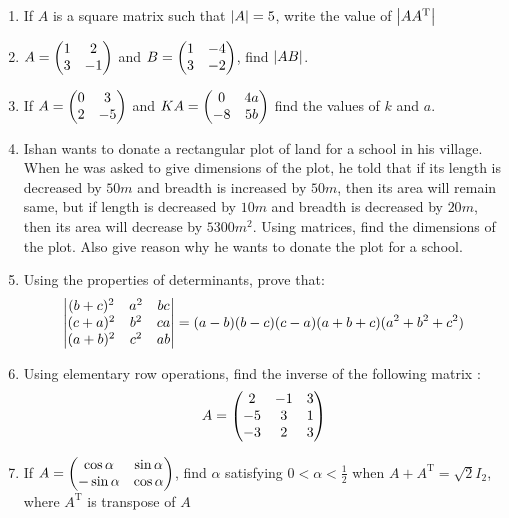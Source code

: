 \begin{enumerate}
    \item If $A$ is a square matrix such that $\left\vert A\right\vert = 5$, write the value of
          $\left\vert AA^{\text{T}}\right\vert$

    \item $A = \begin{pmatrix}1 & 2 \\ 3 & -1\end{pmatrix}$ and $B = \begin{pmatrix}1 & -4 \\ 3 & -2\end{pmatrix}$, find $\left\vert AB\right\vert$.

    \item If $A = \begin{pmatrix}0 & 3 \\ 2 & -5\end{pmatrix}$ and $KA = \begin{pmatrix}0 & 4a \\ -8 & 5b\end{pmatrix}$ find the values of $k$ and $a$.

    \item Ishan wants to donate a rectangular plot of land for a school in his village. When he was asked to give dimensions of the plot, he told that if its length is decreased by $50m$ and breadth is increased by $50m$, then its area will remain same, but if length is decreased by $10m$ and breadth is decreased by $20m$, then its area will decrease by $5300m^2$. Using matrices, find the dimensions of the plot. Also give reason why he wants to donate the plot for a school.

    \item Using the properties of determinants, prove that:
          \begin{align*}
              \begin{vmatrix}(b+c)^2 & a^2 & bc                                                  \\
              (c+a)^2        & b^2 & ca                                                  \\
              (a+b)^2        & c^2 & ab\end{vmatrix} = (a - b) (b-c) (c-a) (a+b+c) (a^2 + b^2 + c^2)
          \end{align*}

    \item Using elementary row operations, find the inverse of the following matrix :
          \begin{align*}
              A = \begin{pmatrix}2 & -1 & 3  \\
              -5           & 3  & 1  \\
              -3           & 2  & 3\end{pmatrix}
          \end{align*}



    \item If $A = \begin{pmatrix}\cos \alpha & \sin \alpha\\ -\sin \alpha & \cos \alpha\end{pmatrix}$, find $\alpha$ satisfying $0<\alpha<\frac{1}{2}$ when $A + A^{\text{T}} = \sqrt{2}I_{2}$, where $A^{\text{T}}$ is transpose of $A$


\end{enumerate}

